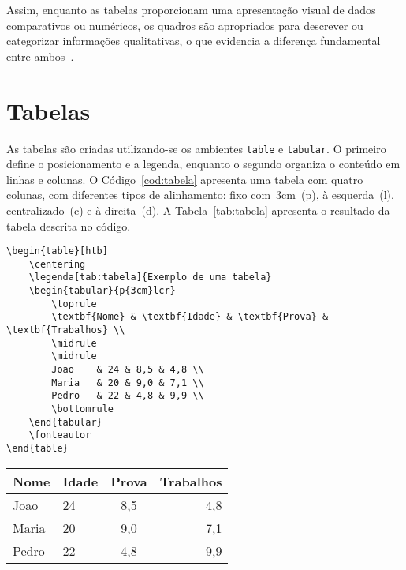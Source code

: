 \documentclass[
    12pt
    ,oneside
    ,a4paper
    ,chapter=TITLE
    ,section=TITLE
    ,sumario=abnt-6027-2012]{abntex2}
\begin{document}
Assim, enquanto as tabelas proporcionam uma apresentação visual de dados comparativos ou numéricos, os quadros são apropriados para descrever ou categorizar informações qualitativas, o que evidencia a diferença fundamental entre ambos~\cite{chagas2016}.

\section{Tabelas}

As tabelas são criadas utilizando-se os ambientes \texttt{table} e \texttt{tabular}. O primeiro define o posicionamento e a legenda, enquanto o segundo organiza o conteúdo em linhas e colunas. O Código~\ref{cod:tabela} apresenta uma tabela com quatro colunas, com diferentes tipos de alinhamento: fixo com~3cm~(p), à esquerda~(l), centralizado~(c) e à direita~(d). A Tabela~\ref{tab:tabela} apresenta o resultado da tabela descrita no código.

\begin{codigo}[htb]
\begin{lstlisting}
\begin{table}[htb]
    \centering
    \legenda[tab:tabela]{Exemplo de uma tabela}
    \begin{tabular}{p{3cm}lcr}
        \toprule
        \textbf{Nome} & \textbf{Idade} & \textbf{Prova} & \textbf{Trabalhos} \\
        \midrule
        \midrule
        Joao    & 24 & 8,5 & 4,8 \\
        Maria   & 20 & 9,0 & 7,1 \\
        Pedro   & 22 & 4,8 & 9,9 \\
        \bottomrule
    \end{tabular}
    \fonteautor
\end{table}
\end{lstlisting}
\fonteautor
\end{codigo}

\begin{table}[htb]
    \centering
    \begin{tabular}{p{3cm}lcr}
        \toprule
        \textbf{Nome} & \textbf{Idade} & \textbf{Prova} & \textbf{Trabalhos} \\
        \midrule
        \midrule
        Joao    & 24 & 8,5 & 4,8 \\
        Maria   & 20 & 9,0 & 7,1 \\
        Pedro   & 22 & 4,8 & 9,9 \\
        \bottomrule
    \end{tabular}
    \fonteautor
\end{table}
\end{document}
